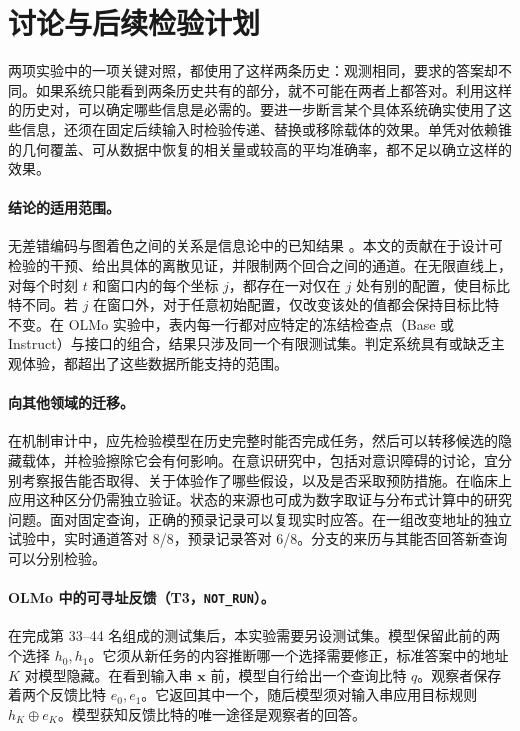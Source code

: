 \section{讨论与后续检验计划}
两项实验中的一项关键对照，都使用了这样两条历史：观测相同，要求的答案却不同。如果系统只能看到两条历史共有的部分，就不可能在两者上都答对。利用这样的历史对，可以确定哪些信息是必需的。要进一步断言某个具体系统确实使用了这些信息，还须在固定后续输入时检验传递、替换或移除载体的效果。单凭对依赖锥的几何覆盖、可从数据中恢复的相关量或较高的平均准确率，都不足以确立这样的效果。

\paragraph{结论的适用范围。}
无差错编码与图着色之间的关系是信息论中的已知结果 \cite{witsenhausen,charpenay}。本文的贡献在于设计可检验的干预、给出具体的离散见证，并限制两个回合之间的通道。在无限直线上，对每个时刻 $t$ 和窗口内的每个坐标 $j$，都存在一对仅在 $j$ 处有别的配置，使目标比特不同。若 $j$ 在窗口外，对于任意初始配置，仅改变该处的值都会保持目标比特不变。在 OLMo 实验中，表内每一行都对应特定的冻结检查点（Base 或 Instruct）与接口的组合，结果只涉及同一个有限测试集。判定系统具有或缺乏主观体验，都超出了这些数据所能支持的范围。

\paragraph{向其他领域的迁移。}
在机制审计中，应先检验模型在历史完整时能否完成任务，然后可以转移候选的隐藏载体，并检验擦除它会有何影响。在意识研究中，包括对意识障碍的讨论，宜分别考察报告能否取得、关于体验作了哪些假设，以及是否采取预防措施。在临床上应用这种区分仍需独立验证。状态的来源也可成为数字取证与分布式计算中的研究问题。面对固定查询，正确的预录记录可以复现实时应答。在一组改变地址的独立试验中，实时通道答对 8/8，预录记录答对 6/8。分支的来历与其能否回答新查询可以分别检验。

\paragraph{OLMo 中的可寻址反馈（T3，\texttt{NOT\_RUN}）。}
在完成第 33--44 名组成的测试集后，本实验需要另设测试集。模型保留此前的两个选择 $h_0,h_1$。它须从新任务的内容推断哪一个选择需要修正，标准答案中的地址 $K$ 对模型隐藏。在看到输入串 $\mathbf{x}$ 前，模型自行给出一个查询比特 $q$。观察者保存着两个反馈比特 $e_0,e_1$。它返回其中一个，随后模型须对输入串应用目标规则 $h_K\oplus e_K$。模型获知反馈比特的唯一途径是观察者的回答。


